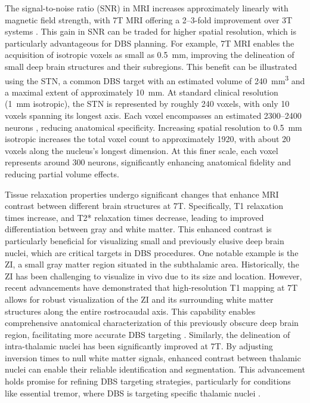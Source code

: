 The signal-to-noise ratio (SNR) in MRI increases approximately linearly with magnetic field strength, with 7T MRI offering a 2--3-fold improvement over 3T systems \cite{Trampel2019-fa}. This gain in SNR can be traded for higher spatial resolution, which is particularly advantageous for DBS planning. For example, 7T MRI enables the acquisition of isotropic voxels as small as 0.5~mm, improving the delineation of small deep brain structures and their subregions. This benefit can be illustrated using the STN, a common DBS target with an estimated volume of 240~mm\textsuperscript{3} and a maximal extent of approximately 10~mm. At standard clinical resolution (1~mm isotropic), the STN is represented by roughly 240 voxels, with only 10 voxels spanning its longest axis. Each voxel encompasses an estimated 2300--2400 neurons \cite{Hamani2004-zr,Hardman2002-ru}, reducing anatomical specificity. Increasing spatial resolution to 0.5~mm isotropic increases the total voxel count to approximately 1920, with about 20 voxels along the nucleus’s longest dimension. At this finer scale, each voxel represents around 300 neurons, significantly enhancing anatomical fidelity and reducing partial volume effects.

Tissue relaxation properties undergo significant changes that enhance MRI contrast between different brain structures at 7T. Specifically, T1 relaxation times increase, and T2* relaxation times decrease, leading to improved differentiation between gray and white matter. This enhanced contrast is particularly beneficial for visualizing small and previously elusive deep brain nuclei, which are critical targets in DBS procedures. One notable example is the ZI, a small gray matter region situated in the subthalamic area. Historically, the ZI has been challenging to visualize in vivo due to its size and location. However, recent advancements have demonstrated that high-resolution T1 mapping at 7T allows for robust visualization of the ZI and its surrounding white matter structures along the entire rostrocaudal axis. This capability enables comprehensive anatomical characterization of this previously obscure deep brain region, facilitating more accurate DBS targeting \cite{Lau2020-dh}. Similarly, the delineation of intra-thalamic nuclei has been significantly improved at 7T. By adjusting inversion times to null white matter signals, enhanced contrast between thalamic nuclei can enable their reliable identification and segmentation. This advancement holds promise for refining DBS targeting strategies, particularly for conditions like essential tremor, where DBS is targeting specific thalamic nuclei \cite{Tourdias2014-un}.

